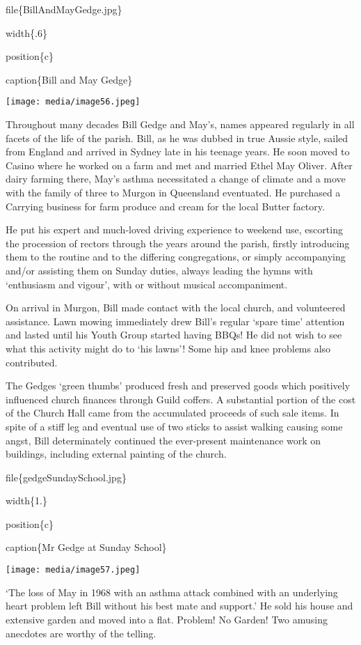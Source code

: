 file\{BillAndMayGedge.jpg\}

width\{.6\}

position\{c\}

caption\{Bill and May Gedge\}

\texttt{[image: media/image56.jpeg]}

Throughout many decades Bill Gedge and May's, names appeared regularly in all facets of the life of the parish. Bill, as he was dubbed in true Aussie style, sailed from England and arrived in Sydney late in his teenage years. He soon moved to Casino where he worked on a farm and met and married Ethel May Oliver. After dairy farming there, May's asthma necessitated a change of climate and a move with the family of three to Murgon in Queensland eventuated. He purchased a Carrying business for farm produce and cream for the local Butter factory.

He put his expert and much-loved driving experience to weekend use, escorting the procession of rectors through the years around the parish, firstly introducing them to the routine and to the differing congregations, or simply accompanying and/or assisting them on Sunday duties, always leading the hymns with `enthusiasm and vigour', with or without musical accompaniment.

On arrival in Murgon, Bill made contact with the local church, and volunteered assistance. Lawn mowing immediately drew Bill's regular `spare time' attention and lasted until his Youth Group started having BBQs! He did not wish to see what this activity might do to `his lawns'! Some hip and knee problems also contributed.

The Gedges `green thumbs' produced fresh and preserved goods which positively influenced church finances through Guild coffers. A substantial portion of the cost of the Church Hall came from the accumulated proceeds of such sale items. In spite of a stiff leg and eventual use of two sticks to assist walking causing some angst, Bill determinately continued the ever-present maintenance work on buildings, including external painting of the church.

file\{gedgeSundaySchool.jpg\}

width\{1.\}

position\{c\}

caption\{Mr Gedge at Sunday School\}

\texttt{[image: media/image57.jpeg]}

`The loss of May in 1968 with an asthma attack combined with an underlying heart problem left Bill without his best mate and support.' He sold his house and extensive garden and moved into a flat. Problem! No Garden! Two amusing anecdotes are worthy of the telling.

